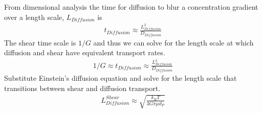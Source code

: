 \documentclass[letterpaper,10pt,english]{sphinxmanual}
\begin{document}
From dimensional analysis the time for diffusion to blur a concentration gradient over a length scale, \(L_{Diffusion}\) is
\begin{equation}\label{equation:Rapid_Mix/RM_Theory_and_Future_Work:Rapid_Mix/RM_Theory_and_Future_Work:22}
\begin{split}t_{Diffusion} \approx \frac{L_{Diffusion}^2}{D_{Diffusion}}\end{split}
\end{equation}
The shear time scale is \(1/G\) and thus we can solve for the length scale at which diffusion and shear have equivalent transport rates.
\begin{equation}\label{equation:Rapid_Mix/RM_Theory_and_Future_Work:Rapid_Mix/RM_Theory_and_Future_Work:23}
\begin{split}1/G \approx t_{Diffusion} \approx \frac{L_{Diffusion}^2}{D_{Diffusion}}\end{split}
\end{equation}
Substitute Einstein’s diffusion equation and solve for the length scale that transitions between shear and diffusion transport.
\begin{equation}\label{equation:Rapid_Mix/RM_Theory_and_Future_Work:Rapid_Mix/RM_Theory_and_Future_Work:24}
\begin{split}L_{Diffusion}^{Shear} \approx \sqrt{\frac{k_B T}{3 G \pi \mu  d_P}}\end{split}
\end{equation}
%
\begin{sphinxVerbatim}[commandchars=\\\{\}]
 
   
         

  
  
  
\end{sphinxVerbatim}
\end{document}
